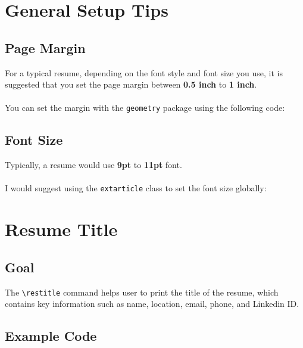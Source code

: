 \documentclass[a4paper,10pt]{article}
\begin{document}
\newpage

\section{General Setup Tips}
\subsection{Page Margin}
For a typical resume, depending on the font style and font size you use, it is suggested that you set the page margin between {\bf 0.5 inch} to {\bf 1 inch}.\\
~\\
You can set the margin with the {\tt geometry} package using the following code:
\begin{codebox}[title=Page Margin]
\usepackage[margin=0.5in]{geometry}
\end{codebox}

\vspace{1cm}

\subsection{Font Size}
Typically, a resume would use {\bf 9pt} to {\bf 11pt} font.\\
~\\
I would suggest using the {\tt extarticle} class to set the font size globally:

\newpage

\section{Resume Title}

\subsection{Goal}
The \verb+\restitle+ command helps user to print the title of the resume, which contains key information such as name, location, email, phone, and Linkedin ID.\\

\subsection{Example Code}
\begin{codebox}[title=Resume Title Example Code]
\end{codebox}
\end{document}

